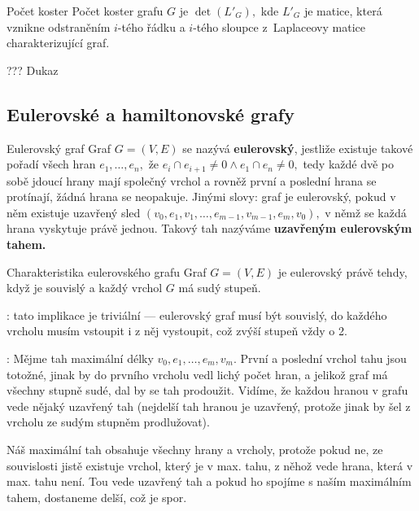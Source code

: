 \begin{vetaN}{Počet koster}
Počet koster grafu $G$ je $\det(L'_G),$ kde $L'_{G}$
je matice, která vznikne odstraněním $i$-tého řádku a $i$-tého sloupce z~Laplaceovy matice charakterizující graf.

??? Dukaz
\end{vetaN}

\subsection{Eulerovské a hamiltonovské grafy}

\begin{definiceN}{Eulerovský graf}
Graf $G=(V,E)$ se nazývá \textbf{eulerovský}, jestliže existuje takové pořadí všech hran $e_1,\dots,e_n,$ že $e_i \cap e_{i+1} \not = 0 \land e_1 \cap e_n \not = 0,$ tedy každé dvě po sobě jdoucí hrany mají společný vrchol a rovněž první a poslední hrana se protínají, žádná hrana se neopakuje. Jinými slovy: graf je eulerovský, pokud v něm existuje uzavřený sled $(v_0,e_1,v_1,\dots,e_{m-1},v_{m-1},e_m,v_0),$ v němž se každá hrana vyskytuje právě jednou. Takový tah nazýváme \textbf{uzavřeným eulerovským tahem.}
\end{definiceN}

\begin{vetaN}{Charakteristika eulerovského grafu}
Graf $G=(V,E)$ je eulerovský právě tehdy, když je souvislý a každý vrchol $G$ má sudý stupeň.

\medskip
\begin{dukaz}
\uv{$\Rightarrow$}: tato implikace je triviální --- eulerovský graf musí být souvislý, do každého vrcholu musím vstoupit i z něj vystoupit, což zvýší stupeň vždy o 2.

\bigskip
\noindent \uv{$\Leftarrow$}: Mějme tah maximální délky $v_0,e_1,\dots,e_m,v_m.$ První a poslední vrchol tahu jsou totožné, jinak by do prvního vrcholu vedl lichý počet hran, a jelikož graf má všechny stupně sudé, dal by se tah prodoužit. Vidíme, že každou hranou v grafu vede nějaký uzavřený tah (nejdelší tah hranou je uzavřený, protože jinak by šel z vrcholu ze sudým stupněm prodlužovat). 

Náš maximální tah obsahuje všechny hrany a vrcholy, protože pokud ne, ze souvislosti jistě existuje vrchol, který je v max. tahu, z něhož vede hrana, která v max. tahu není. Tou vede uzavřený tah a pokud ho spojíme s naším maximálním tahem, dostaneme delší, což je spor.
\end{dukaz}
\end{vetaN}

